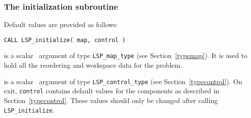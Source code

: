 \documentclass{galahad}
\newcommand{\packagename}{LSP}
\begin{document}

\subsubsection{The initialization subroutine}\label{subinit}
 Default values are provided as follows:
\vspace*{1mm}

\hspace{8mm}
{\tt CALL \packagename\_initialize( map, control )}

\vspace*{-2mm}
\begin{description}

 is a scalar \intentout\ argument of type
{\tt \packagename\_map\_type} (see Section~\ref{typemap}).
It is used to hold all the reordering and workspace data for the problem.

 is a scalar \intentout\ argument of type
{\tt \packagename\_control\_type}
(see Section~\ref{typecontrol}).
On exit, {\tt control} contains default values for the components as
described in Section~\ref{typecontrol}.
These values should only be changed after calling
{\tt \packagename\_initialize}.

\end{description}

\end{document}
